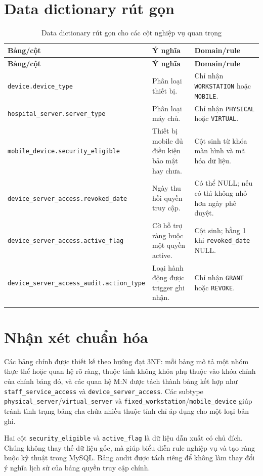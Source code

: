 \documentclass[12pt, a4paper, oneside, openany]{report}
\newcommand{\dbid}[1]{{\normalfont\ttfamily\footnotesize\nolinkurl{#1}}}
\newcommand{\tabdbid}[1]{{\normalfont\ttfamily\scriptsize\nolinkurl{#1}}}
\begin{document}
\section{Data dictionary rút gọn}

\begin{longtable}{|L{4.9cm}|L{4.2cm}|L{4.5cm}|}
\hline
\normalfont\normalsize\textbf{Bảng/cột} & \textbf{Ý nghĩa} & \textbf{Domain/rule} \\
\hline
\endfirsthead
\hline
\normalfont\normalsize\textbf{Bảng/cột} & \textbf{Ý nghĩa} & \textbf{Domain/rule} \\
\hline
\endhead
\tabdbid{device.device_type} & Phân loại thiết bị. & Chỉ nhận \dbid{WORKSTATION} hoặc \dbid{MOBILE}. \\
\hline
\tabdbid{hospital_server.server_type} & Phân loại máy chủ. & Chỉ nhận \dbid{PHYSICAL} hoặc \dbid{VIRTUAL}. \\
\hline
\tabdbid{mobile_device.security_eligible} & Thiết bị mobile đủ điều kiện bảo mật hay chưa. & Cột sinh từ khóa màn hình và mã hóa dữ liệu. \\
\hline
\tabdbid{device_server_access.revoked_date} & Ngày thu hồi quyền truy cập. & Có thể NULL; nếu có thì không nhỏ hơn ngày phê duyệt. \\
\hline
\tabdbid{device_server_access.active_flag} & Cờ hỗ trợ ràng buộc một quyền active. & Cột sinh; bằng 1 khi \dbid{revoked_date} NULL. \\
\hline
\tabdbid{device_server_access_audit.action_type} & Loại hành động được trigger ghi nhận. & Chỉ nhận \dbid{GRANT} hoặc \dbid{REVOKE}. \\
\hline
\caption{Data dictionary rút gọn cho các cột nghiệp vụ quan trọng}
\end{longtable}

\section{Nhận xét chuẩn hóa}

Các bảng chính được thiết kế theo hướng đạt 3NF: mỗi bảng mô tả một nhóm thực thể hoặc quan hệ rõ ràng, thuộc tính không khóa phụ thuộc vào khóa chính của chính bảng đó, và các quan hệ M:N được tách thành bảng kết hợp như \dbid{staff_service_access} và \dbid{device_server_access}. Các subtype \dbid{physical_server}/\dbid{virtual_server} và \dbid{fixed_workstation}/\dbid{mobile_device} giúp tránh tình trạng bảng cha chứa nhiều thuộc tính chỉ áp dụng cho một loại bản ghi.

Hai cột \dbid{security_eligible} và \dbid{active_flag} là dữ liệu dẫn xuất có chủ đích. Chúng không thay thế dữ liệu gốc, mà giúp biểu diễn rule nghiệp vụ và tạo ràng buộc kỹ thuật trong MySQL. Bảng audit được tách riêng để không làm thay đổi ý nghĩa lịch sử của bảng quyền truy cập chính.
\end{document}
